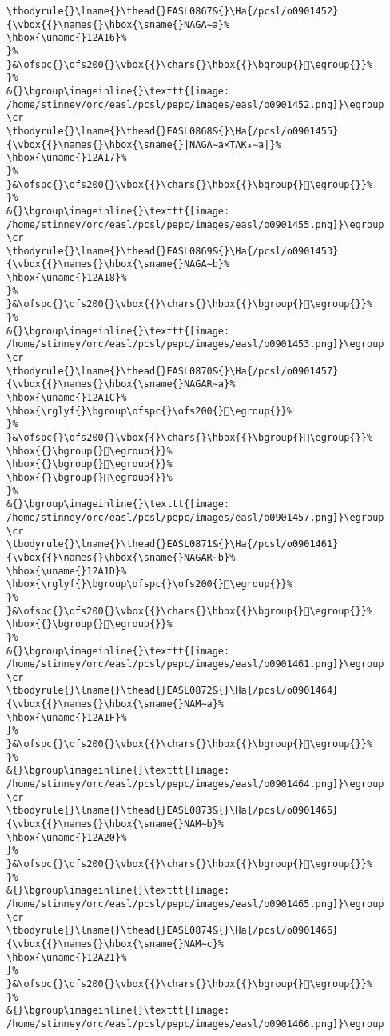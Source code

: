 \begin{verbatim}
\tbodyrule{}\lname{}\thead{}EASL0867&{}\Ha{/pcsl/o0901452}{\vbox{{}\names{}\hbox{\sname{}NAGA∼a}%
\hbox{\uname{}12A16}%
}%
}&\ofspc{}\ofs200{}\vbox{{}\chars{}\hbox{{}\bgroup{}𒨖\egroup{}}%
}%
&{}\bgroup\imageinline{}\texttt{[image: /home/stinney/orc/easl/pcsl/pepc/images/easl/o0901452.png]}\egroup
\cr
\tbodyrule{}\lname{}\thead{}EASL0868&{}\Ha{/pcsl/o0901455}{\vbox{{}\names{}\hbox{\sname{}|NAGA∼a×TAK₄∼a|}%
\hbox{\uname{}12A17}%
}%
}&\ofspc{}\ofs200{}\vbox{{}\chars{}\hbox{{}\bgroup{}𒨗\egroup{}}%
}%
&{}\bgroup\imageinline{}\texttt{[image: /home/stinney/orc/easl/pcsl/pepc/images/easl/o0901455.png]}\egroup
\cr
\tbodyrule{}\lname{}\thead{}EASL0869&{}\Ha{/pcsl/o0901453}{\vbox{{}\names{}\hbox{\sname{}NAGA∼b}%
\hbox{\uname{}12A18}%
}%
}&\ofspc{}\ofs200{}\vbox{{}\chars{}\hbox{{}\bgroup{}𒨘\egroup{}}%
}%
&{}\bgroup\imageinline{}\texttt{[image: /home/stinney/orc/easl/pcsl/pepc/images/easl/o0901453.png]}\egroup
\cr
\tbodyrule{}\lname{}\thead{}EASL0870&{}\Ha{/pcsl/o0901457}{\vbox{{}\names{}\hbox{\sname{}NAGAR∼a}%
\hbox{\uname{}12A1C}%
\hbox{\rglyf{}\bgroup\ofspc{}\ofs200{}𒨜\egroup{}}%
}%
}&\ofspc{}\ofs200{}\vbox{{}\chars{}\hbox{{}\bgroup{}𒨙\egroup{}}%
\hbox{{}\bgroup{}𒨚\egroup{}}%
\hbox{{}\bgroup{}𒨛\egroup{}}%
\hbox{{}\bgroup{}𒨜\egroup{}}%
}%
&{}\bgroup\imageinline{}\texttt{[image: /home/stinney/orc/easl/pcsl/pepc/images/easl/o0901457.png]}\egroup
\cr
\tbodyrule{}\lname{}\thead{}EASL0871&{}\Ha{/pcsl/o0901461}{\vbox{{}\names{}\hbox{\sname{}NAGAR∼b}%
\hbox{\uname{}12A1D}%
\hbox{\rglyf{}\bgroup\ofspc{}\ofs200{}𒨝\egroup{}}%
}%
}&\ofspc{}\ofs200{}\vbox{{}\chars{}\hbox{{}\bgroup{}𒨝\egroup{}}%
\hbox{{}\bgroup{}𒨞\egroup{}}%
}%
&{}\bgroup\imageinline{}\texttt{[image: /home/stinney/orc/easl/pcsl/pepc/images/easl/o0901461.png]}\egroup
\cr
\tbodyrule{}\lname{}\thead{}EASL0872&{}\Ha{/pcsl/o0901464}{\vbox{{}\names{}\hbox{\sname{}NAM∼a}%
\hbox{\uname{}12A1F}%
}%
}&\ofspc{}\ofs200{}\vbox{{}\chars{}\hbox{{}\bgroup{}𒨟\egroup{}}%
}%
&{}\bgroup\imageinline{}\texttt{[image: /home/stinney/orc/easl/pcsl/pepc/images/easl/o0901464.png]}\egroup
\cr
\tbodyrule{}\lname{}\thead{}EASL0873&{}\Ha{/pcsl/o0901465}{\vbox{{}\names{}\hbox{\sname{}NAM∼b}%
\hbox{\uname{}12A20}%
}%
}&\ofspc{}\ofs200{}\vbox{{}\chars{}\hbox{{}\bgroup{}𒨠\egroup{}}%
}%
&{}\bgroup\imageinline{}\texttt{[image: /home/stinney/orc/easl/pcsl/pepc/images/easl/o0901465.png]}\egroup
\cr
\tbodyrule{}\lname{}\thead{}EASL0874&{}\Ha{/pcsl/o0901466}{\vbox{{}\names{}\hbox{\sname{}NAM∼c}%
\hbox{\uname{}12A21}%
}%
}&\ofspc{}\ofs200{}\vbox{{}\chars{}\hbox{{}\bgroup{}𒨡\egroup{}}%
}%
&{}\bgroup\imageinline{}\texttt{[image: /home/stinney/orc/easl/pcsl/pepc/images/easl/o0901466.png]}\egroup

\end{verbatim}

